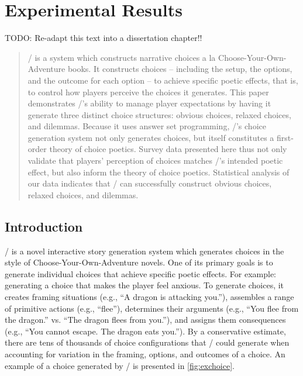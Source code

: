 \chapter{Experimental Results}

\label{ch:results}

TODO: Re-adapt this text into a dissertation chapter!!

\begin{quote}
\dunyazad/ is a system which constructs narrative choices a la Choose-Your-Own-Adventure books.
%
It constructs choices -- including the setup, the options, and the outcome for each option -- to achieve specific poetic effects, that is, to control how players perceive the choices it generates.
%
This paper demonstrates \dunyazad/'s ability to manage player expectations by having it generate three distinct choice structures: obvious choices, relaxed choices, and dilemmas.
%
Because it uses answer set programming, \dunyazad/'s choice generation system not only generates choices, but itself constitutes a first-order theory of choice poetics.
%
Survey data presented here thus not only validate that players' perception of choices matches \dunyazad/'s intended poetic effect, but also inform the theory of choice poetics.
%
Statistical analysis of our data indicates that \dunyazad/ can successfully construct obvious choices, relaxed choices, and dilemmas.
\end{quote}


\section{Introduction}

\dunyazad/ is a novel interactive story generation system which generates choices in the style of Choose-Your-Own-Adventure novels.
%
One of its primary goals is to generate individual choices that achieve specific poetic effects.
%
For example: generating a choice that makes the player feel anxious.
%
To generate choices, it creates framing situations (e.g., ``A dragon is attacking you.''), assembles a range of primitive actions (e.g., ``flee''), determines their arguments (e.g., ``You flee from the dragon.'' vs. ``The dragon flees from you.''), and assigns them consequences (e.g., ``You cannot escape. The dragon eats you.'').
%
By a conservative estimate, there are tens of thousands of choice configurations that \dunyazad/ could generate when accounting for variation in the framing, options, and outcomes of a choice.
%
An example of a choice generated by \dunyazad/ is presented in \cref{fig:exchoice}.


